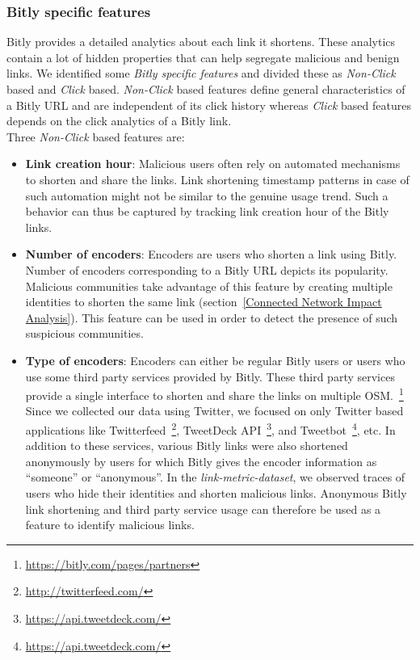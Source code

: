 \documentclass[conference]{IEEEtran}
\begin{document}
\subsubsection{Bitly specific features}
Bitly provides a detailed analytics about each link it shortens. 
These analytics contain a lot of hidden properties that can help segregate malicious and benign links. We identified some \textit{Bitly specific features} and divided these as \textit{Non-Click} based and \textit{Click} based. \textit{Non-Click} based features define general characteristics of a Bitly URL and are independent of its click history whereas \textit{Click} based features depends on the click analytics of a Bitly link.\\
Three \textit{Non-Click} based features are:
\begin{itemize}[leftmargin=0.4cm]
 \item {\bf Link creation hour}: Malicious users often rely on automated mechanisms to shorten and share the links. Link shortening timestamp patterns in case of such automation might not be similar to the genuine usage trend. Such a behavior can thus be captured by tracking link creation hour of the Bitly links.
 \item {\bf Number of encoders}: Encoders are users who shorten a link using Bitly. Number of encoders corresponding to a Bitly URL depicts its popularity. Malicious communities take advantage of this feature by creating multiple identities to shorten the same link (section~\ref{Connected Network Impact Analysis}). This feature can be used in order to detect the presence of such suspicious communities.
\item {\bf Type of encoders}: Encoders can either be regular Bitly users or users who use some third party services provided by Bitly. These third party services provide a single interface to shorten and share the links on multiple OSM.~\footnote{\url{https://bitly.com/pages/partners}} Since we collected our data using Twitter, we focused on only Twitter based applications like Twitterfeed~\footnote{\url{http://twitterfeed.com/}}, TweetDeck API~\footnote{\url{https://api.tweetdeck.com/}}, and Tweetbot~\footnote{\url{https://api.tweetdeck.com/}}, etc. 
In addition to these services, various Bitly links were also shortened anonymously by users for which Bitly gives the encoder information as ``someone'' or ``anonymous''. In the \textit{link-metric-dataset}, we observed traces of users who hide their identities and shorten malicious links. Anonymous Bitly link shortening and third party service usage can therefore be used as a feature to identify malicious links.
\end{itemize}
\end{document}
